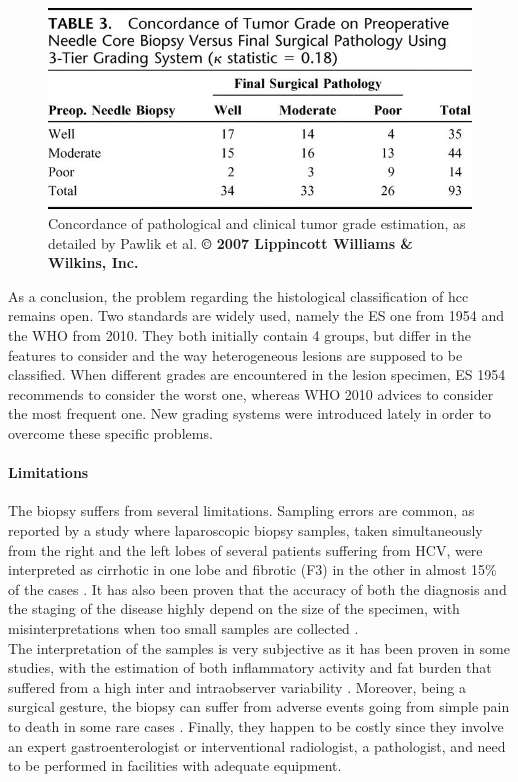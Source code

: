 \begin{figure}[th!]
\centering
\includegraphics[width=0.7\linewidth]{../HistologicalGradePrediction/images/pawlik_table3}
\caption{Concordance of pathological and clinical tumor grade estimation, as detailed by Pawlik et al. \textbf{© 2007 Lippincott Williams \& Wilkins, Inc. \cite{Pawlik2007}}}
\label{fig:pawlik_table3}
\end{figure}

As a conclusion, the problem regarding the histological classification
of \ac{hcc} remains open. Two standards are widely used, namely the ES one
from 1954 and the WHO from 2010. They both initially contain 4 groups,
but differ in the features to consider and the way heterogeneous lesions
are supposed to be classified. When different grades are encountered in
the lesion specimen, ES 1954 recommends to consider the worst one,
whereas WHO 2010 advices to consider the most frequent one. New
grading systems were introduced lately in order to overcome these
specific problems.

\paragraph{Limitations}\label{biopsy-limitation}

The biopsy suffers from several limitations. Sampling errors
are common, as reported by a study where laparoscopic biopsy samples,
taken simultaneously from the right and the left lobes of several
patients suffering from HCV, were interpreted as cirrhotic in one lobe
and fibrotic (F3) in the other in almost 15\% of the cases \cite{Regev2002}. It has also been proven that the
accuracy of both the diagnosis and the staging of the disease highly
depend on the size of the specimen, with misinterpretations when too
small samples are collected \cite{Colloredo2003}.\\
The interpretation of the samples is very subjective as it has been
proven in some studies, with the estimation of both inflammatory
activity and fat burden that suffered from a high inter and
intraobserver variability \cite{Bedossa1994}.
Moreover, being a surgical gesture, the biopsy can suffer from adverse
events going from simple pain to death in some rare cases \cite{Rockey2009, Castera2001, Seeff2010, Piccinino1986}. Finally, they happen to be costly since
they involve an expert gastroenterologist or interventional radiologist, a pathologist,
and need to be performed in facilities with adequate equipment.

